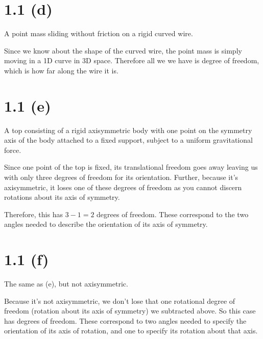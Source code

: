 \documentclass{article}
\begin{document}
\section*{1.1 (d)}

A point mass sliding without friction on a rigid curved wire.

Since we know about the shape of the curved wire, the point mass is
simply moving in a 1D curve in 3D space. Therefore all we we have is
 degree of freedom, which is how far along the wire it is.

\section*{1.1 (e)}

A top consisting of a rigid axisymmetric body with one point on the
symmetry axis of the body attached to a fixed support, subject to a
uniform gravitational force.

Since one point of the top is fixed, its translational freedom goes
away leaving us with only three degrees of freedom for its
orientation. Further, because it's axisymmetric, it loses one of these
degrees of freedom as you cannot discern rotations about its axis of
symmetry.

Therefore, this has $3 - 1 = \boxed{2}$ degrees of freedom. These
correspond to the two angles needed to describe the orientation of its
axis of symmetry.

\section*{1.1 (f)}

The same as (e), but not axisymmetric.

Because it's not axisymmetric, we don't lose that one rotational
degree of freedom (rotation about its axis of symmetry) we subtracted
above. So this case has  degrees of freedom. These correspond
to two angles needed to specify the orientation of its axis of
rotation, and one to specify its rotation about that axis.
\end{document}

